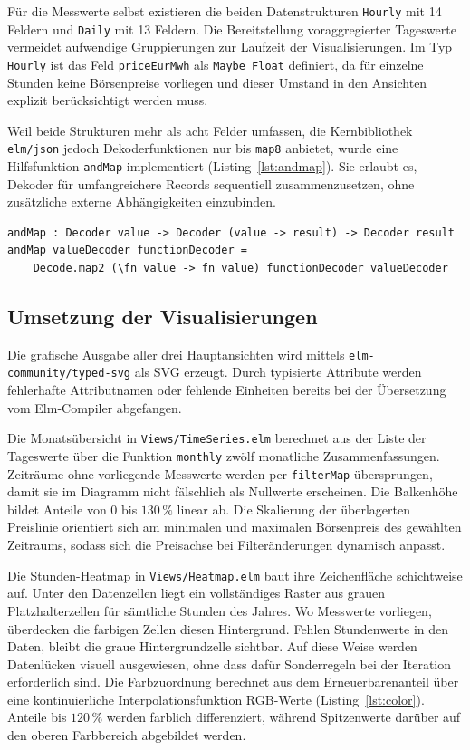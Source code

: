 Für die Messwerte selbst existieren die beiden Datenstrukturen \texttt{Hourly} mit 14 Feldern und \texttt{Daily} mit 13 Feldern. Die Bereitstellung voraggregierter Tageswerte vermeidet aufwendige Gruppierungen zur Laufzeit der Visualisierungen. Im Typ \texttt{Hourly} ist das Feld \texttt{priceEurMwh} als \texttt{Maybe Float} definiert, da für einzelne Stunden keine Börsenpreise vorliegen und dieser Umstand in den Ansichten explizit berücksichtigt werden muss.

Weil beide Strukturen mehr als acht Felder umfassen, die Kernbibliothek \texttt{elm/json} jedoch Dekoderfunktionen nur bis \texttt{map8} anbietet, wurde eine Hilfsfunktion \texttt{andMap} implementiert (Listing~\ref{lst:andmap}). Sie erlaubt es, Dekoder für umfangreichere Records sequentiell zusammenzusetzen, ohne zusätzliche externe Abhängigkeiten einzubinden.

\begin{lstlisting}[caption={andMap erweitert map8 auf beliebig viele Felder},label={lst:andmap}]
andMap : Decoder value -> Decoder (value -> result) -> Decoder result
andMap valueDecoder functionDecoder =
    Decode.map2 (\fn value -> fn value) functionDecoder valueDecoder
\end{lstlisting}

\subsection*{Umsetzung der Visualisierungen}

Die grafische Ausgabe aller drei Hauptansichten wird mittels \texttt{elm-community/typed-svg} als SVG erzeugt. Durch typisierte Attribute werden fehlerhafte Attributnamen oder fehlende Einheiten bereits bei der Übersetzung vom Elm-Compiler abgefangen.

Die Monatsübersicht in \texttt{Views/TimeSeries.elm} berechnet aus der Liste der Tageswerte über die Funktion \texttt{monthly} zwölf monatliche Zusammenfassungen. Zeiträume ohne vorliegende Messwerte werden per \texttt{filterMap} übersprungen, damit sie im Diagramm nicht fälschlich als Nullwerte erscheinen. Die Balkenhöhe bildet Anteile von 0 bis $130\,\%$ linear ab. Die Skalierung der überlagerten Preislinie orientiert sich am minimalen und maximalen Börsenpreis des gewählten Zeitraums, sodass sich die Preisachse bei Filteränderungen dynamisch anpasst.

Die Stunden-Heatmap in \texttt{Views/Heatmap.elm} baut ihre Zeichenfläche schichtweise auf. Unter den Datenzellen liegt ein vollständiges Raster aus grauen Platzhalterzellen für sämtliche Stunden des Jahres. Wo Messwerte vorliegen, überdecken die farbigen Zellen diesen Hintergrund. Fehlen Stundenwerte in den Daten, bleibt die graue Hintergrundzelle sichtbar. Auf diese Weise werden Datenlücken visuell ausgewiesen, ohne dass dafür Sonderregeln bei der Iteration erforderlich sind. Die Farbzuordnung berechnet aus dem Erneuerbarenanteil über eine kontinuierliche Interpolationsfunktion RGB-Werte (Listing~\ref{lst:color}). Anteile bis $120\,\%$ werden farblich differenziert, während Spitzenwerte darüber auf den oberen Farbbereich abgebildet werden.

